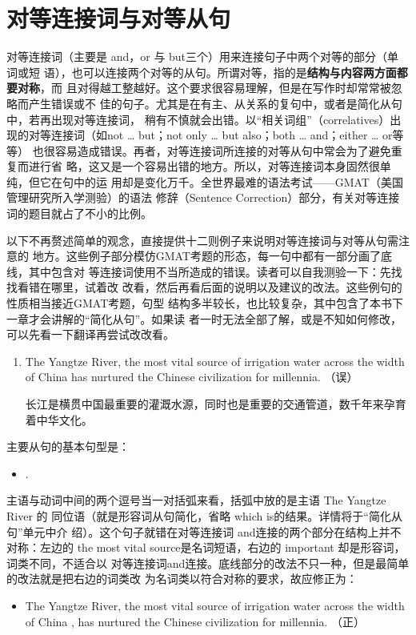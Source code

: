 \chapter{对等连接词与对等从句}

对等连接词（主要是 and，or 与 but三个）用来连接句子中两个对等的部分（单词或短
语），也可以连接两个对等的从句。所谓对等，指的是\textbf{结构与内容两方面都要对称}，而
且对得越工整越好。这个要求很容易理解，但是在写作时却常常被忽略而产生错误或不
佳的句子。尤其是在有主、从关系的复句中，或者是简化从句中，若再出现对等连接词，
稍有不慎就会出错。以“相关词组”（correlatives）出现的对等连接词（如not
\ldots{} but；not only \ldots{} but also；both \ldots{} and；either \ldots{} or等等）
也很容易造成错误。再者，对等连接词所连接的对等从句中常会为了避免重复而进行省
略，这又是一个容易出错的地方。所以，对等连接词本身固然很单纯，但它在句中的运
用却是变化万千。全世界最难的语法考试——GMAT（美国管理研究所入学测验）的语法
修辞（Sentence Correction）部分，有关对等连接词的题目就占了不小的比例。

以下不再赘述简单的观念，直接提供十二则例子来说明对等连接词与对等从句需注意的
地方。这些例子部分模仿GMAT考题的形态，每一句中都有一部分画了底线，其中包含对
等连接词使用不当所造成的错误。读者可以自我测验一下：先找找看错在哪里，试着改
改看，然后再看后面的说明以及建议的改法。这些例句的性质相当接近GMAT考题，句型
结构多半较长，也比较复杂，其中包含了本书下一章才会讲解的“简化从句”。如果读
者一时无法全部了解，或是不知如何修改，可以先看一下翻译再尝试改改看。

\begin{enumerate}
\item The Yangtze River, the most vital source of irrigation water across the
  width of China  has
  nurtured the Chinese civilization for millennia. （误）


  长江是横贯中国最重要的灌溉水源，同时也是重要的交通管道，数千年来孕育着中华文化。
\end{enumerate}


主要从句的基本句型是：
\begin{itemize}
\item {}  .
\end{itemize}

主语与动词中间的两个逗号当一对括弧来看，括弧中放的是主语 The Yangtze River 的
同位语（就是形容词从句简化，省略 which is的结果。详情将于“简化从句”单元中介
绍）。这个句子就错在对等连接词 and连接的两个部分在结构上并不对称：左边的 the
most vital source是名词短语，右边的 important 却是形容词，词类不同，不适合以
对等连接词and连接。底线部分的改法不只一种，但是最简单的改法就是把右边的词类改
为名词类以符合对称的要求，故应修正为：
\begin{mybox}
\begin{itemize}
\item The Yangtze River, the most vital source of irrigation water across the
  width of China , has nurtured the
  Chinese civilization for millennia. （正）
\end{itemize}
\end{mybox}

